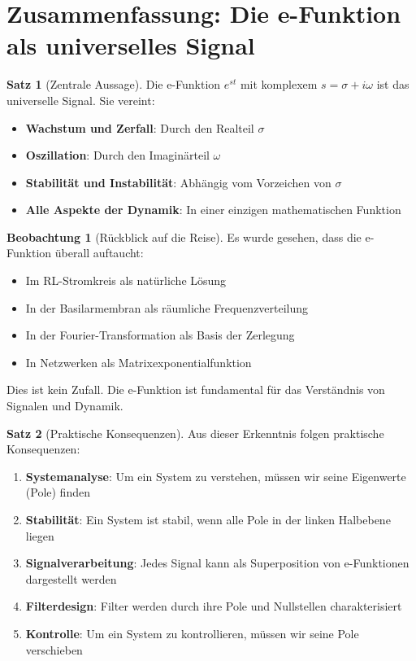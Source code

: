 ﻿\documentclass[a4paper,12pt]{report}
\theoremstyle{definition}
\newtheorem{satz}{Satz}
\newtheorem{beobachtung}{Beobachtung}
\begin{document}
	\section{Zusammenfassung: Die e-Funktion als universelles Signal}
	
	\begin{satz}[Zentrale Aussage]
		Die e-Funktion $e^{st}$ mit komplexem $s = \sigma + i\omega$ ist das universelle Signal. Sie vereint:
		
		\begin{itemize}
			\item[-] \textbf{Wachstum und Zerfall}: Durch den Realteil $\sigma$
			\item[-] \textbf{Oszillation}: Durch den Imaginärteil $\omega$
			\item[-] \textbf{Stabilität und Instabilität}: Abhängig vom Vorzeichen von $\sigma$
			\item[-] \textbf{Alle Aspekte der Dynamik}: In einer einzigen mathematischen Funktion
		\end{itemize}
	\end{satz}
	
	\begin{beobachtung}[Rückblick auf die Reise]
		Es wurde gesehen, dass die e-Funktion überall auftaucht:
		\begin{itemize}
			\item[-] Im RL-Stromkreis als natürliche Lösung
			\item[-] In der Basilarmembran als räumliche Frequenzverteilung
			\item[-] In der Fourier-Transformation als Basis der Zerlegung
			\item[-] In Netzwerken als Matrixexponentialfunktion
		\end{itemize}
		
		Dies ist kein Zufall. Die e-Funktion ist fundamental für das Verständnis von Signalen und Dynamik.
	\end{beobachtung}
	
	\begin{satz}[Praktische Konsequenzen]
		Aus dieser Erkenntnis folgen praktische Konsequenzen:
		
		\begin{enumerate}
			\item[-] \textbf{Systemanalyse}: Um ein System zu verstehen, müssen wir seine Eigenwerte (Pole) finden
			\item[-] \textbf{Stabilität}: Ein System ist stabil, wenn alle Pole in der linken Halbebene liegen
			\item[-] \textbf{Signalverarbeitung}: Jedes Signal kann als Superposition von e-Funktionen dargestellt werden
			\item[-] \textbf{Filterdesign}: Filter werden durch ihre Pole und Nullstellen charakterisiert
			\item[-] \textbf{Kontrolle}: Um ein System zu kontrollieren, müssen wir seine Pole verschieben
		\end{enumerate}
	\end{satz}
	
\end{document}
